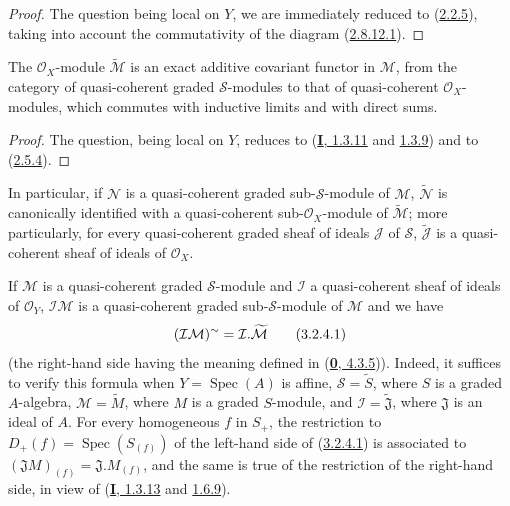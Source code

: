 \begin{proof}
The question being local on $Y$, we are immediately reduced to
(\hyperref[II.2.2.5]{2.2.5}), taking into account the commutativity of the
diagram (\hyperref[II.2.8.12.1]{2.8.12.1}).
\end{proof}

\begin{proposition}[3.2.4]
\label{II.3.2.4}
The $\mathcal{O}_X$-module $\widetilde{\mathcal{M}}$ is an exact additive
covariant functor in $\mathcal{M}$, from the category of quasi-coherent
graded $\mathcal{S}$-modules to that of quasi-coherent $\mathcal{O}_X$-modules,
which commutes with inductive limits and with direct sums.
\end{proposition}

\begin{proof}
The question, being local on $Y$, reduces to
(\hyperref[I.1.3.11]{\textbf{I}, 1.3.11} and
\hyperref[I.1.3.9]{1.3.9}) and to
(\hyperref[II.2.5.4]{2.5.4}).
\end{proof}

In particular, if $\mathcal{N}$ is a quasi-coherent graded
sub-$\mathcal{S}$-module of $\mathcal{M}$, $\widetilde{\mathcal{N}}$ is
canonically identified with a quasi-coherent sub-$\mathcal{O}_X$-module of
$\widetilde{\mathcal{M}}$; more particularly, for every quasi-coherent graded
sheaf of ideals $\mathcal{J}$ of $\mathcal{S}$,
$\widetilde{\mathcal{J}}$ is a quasi-coherent sheaf of ideals of
$\mathcal{O}_X$.

If $\mathcal{M}$ is a quasi-coherent graded $\mathcal{S}$-module and
$\mathcal{I}$ a quasi-coherent sheaf of ideals of $\mathcal{O}_Y$,
$\mathcal{I}\mathcal{M}$ is a quasi-coherent graded sub-$\mathcal{S}$-module
of $\mathcal{M}$ and we have
\[
\label{II.3.2.4.1}
  (\mathcal{I}\mathcal{M})^{\sim}
  =\mathcal{I}.\widetilde{\mathcal{M}}
\tag{3.2.4.1}
\]
(the right-hand side having the meaning defined in
(\hyperref[0.4.3.5]{\textbf{0}, 4.3.5})). Indeed, it suffices to verify this
formula when $Y=\operatorname{Spec}(A)$ is affine,
$\mathcal{S}=\widetilde{S}$, where $S$ is a graded $A$-algebra,
$\mathcal{M}=\widetilde{M}$,
where $M$ is a graded $S$-module, and
$\mathcal{I}=\widetilde{\mathfrak{J}}$, where $\mathfrak{J}$ is an ideal of
$A$. For every homogeneous $f$ in $S_+$, the restriction to
$D_+(f)=\operatorname{Spec}(S_{(f)})$ of the left-hand side of
(\hyperref[II.3.2.4.1]{3.2.4.1}) is associated to
$(\mathfrak{J}M)_{(f)}=\mathfrak{J}.M_{(f)}$, and the same is true of
the restriction of the right-hand side, in view of
(\hyperref[I.1.3.13]{\textbf{I}, 1.3.13} and
\hyperref[I.1.6.9]{1.6.9}).

